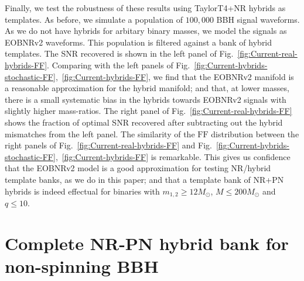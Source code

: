 \documentclass[aps,
prd,
twocolumn,
superscriptaddress,
lengthcheck,showpacs,letterpaper,nofootinbib,
floatfix]{revtex4-1}
\newcommand{\FF}{\mathrm{FF}}
\begin{document}
Finally, we test the robustness of these results using TaylorT4+NR hybrids 
as templates. As before, we simulate a population of $100,000$ BBH signal 
waveforms. As we do not have hybrids for arbitary binary
masses, we model the signals as EOBNRv2 waveforms. This population is filtered
against a bank of hybrid templates. The SNR recovered is shown in the left 
panel of Fig.~\ref{fig:Current-real-hybrids-FF}. Comparing with the left panels 
of Fig.~\ref{fig:Current-hybrids-stochastic-FF},~\ref{fig:Current-hybrids-FF}, 
we find that the EOBNRv2 manifold is a reasonable approximation for the hybrid 
manifold; and that, at lower masses, there is a small systematic bias in the 
hybrids towards EOBNRv2 signals with slightly higher mass-ratios.
The right panel of Fig.~\ref{fig:Current-real-hybrids-FF} 
shows the fraction of optimal SNR recovered after subtracting out the hybrid
mismatches from the left panel. The similarity of the $\FF$ distribution between 
the right panels of Fig.~\ref{fig:Current-real-hybrids-FF} and 
Fig.~\ref{fig:Current-hybrids-stochastic-FF},~\ref{fig:Current-hybrids-FF}
is remarkable. This gives us confidence that the EOBNRv2 model is a good 
approximation for testing NR/hybrid template banks, as we do in this paper; 
and that a template bank of NR+PN hybrids is indeed effectual for binaries 
with $m_{1,2}\geq 12M_\odot$, $M\leq 200M_\odot$ and $q\leq 10$.



\section{Complete NR-PN hybrid bank for non-spinning BBH}\label{s1:futureNRpNhybridbank}
\end{document}
